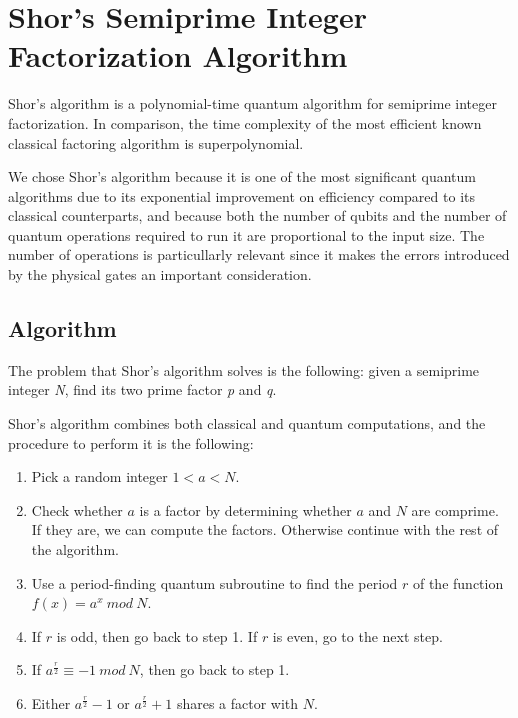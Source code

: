 %
%
\chapter {Shor's Semiprime Integer Factorization Algorithm}

Shor's algorithm is a polynomial-time quantum algorithm for semiprime integer factorization. In comparison, the time complexity of the most efficient known classical factoring algorithm is superpolynomial.

We chose Shor's algorithm because it is one of the most significant quantum algorithms due to its exponential improvement on efficiency compared to its classical counterparts, and because both the number of qubits and the number of quantum operations required to run it are proportional to the input size. The number of operations is particullarly relevant since it makes the errors introduced by the physical gates an important consideration.

\section{Algorithm}

The problem that Shor's algorithm solves is the following: given a semiprime integer \textit{N}, find its two prime factor \textit{p} and \textit{q}.

Shor's algorithm combines both classical and quantum computations, and the procedure to perform it is the following:
\begin{enumerate}
    \item Pick a random integer $1 < a < N$.
    \item Check whether $a$ is a factor by determining whether $a$ and $N$ are comprime. If they are, we can compute the factors. Otherwise continue with the rest of the algorithm.
    \item Use a period-finding quantum subroutine to find the period $r$ of the function $f(x)=a^{x} \ mod \ N$.
    \item If $r$ is odd, then go back to step 1. If $r$ is even, go to the next step.
    \item If $a^{\frac{r}{2}} \equiv -1  \ mod \ N$, then go back to step 1.
    \item Either $a^{\frac{r}{2}} - 1$ or $a^{\frac{r}{2}} + 1$ shares a factor with $N$.
\end{enumerate}

